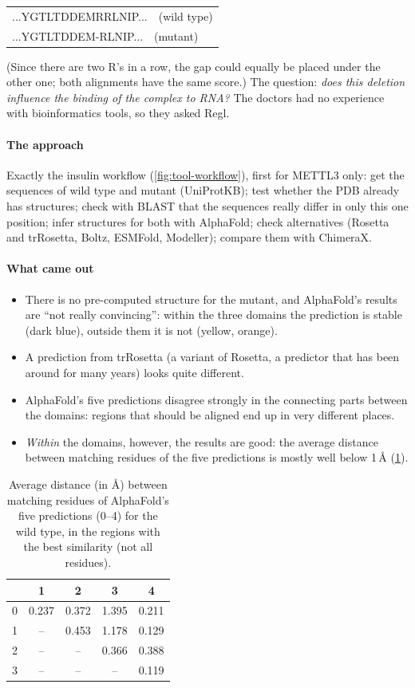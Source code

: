 \documentclass[11pt, oneside]{book}
\makeatletter
\newcommand{\alnblock}[1]{%
  \par\smallskip
  {\centering\ttfamily\small
   \begin{tabular}{@{}l@{}}#1\end{tabular}\par}%
  \smallskip}
\makeatother
\begin{document}
\alnblock{%
...YGTLTDDEMRRLNIP...~~(wild type)\\
...YGTLTDDEM-RLNIP...~~(mutant)}

(Since there are two R's in a row, the gap could equally be placed under the
other one; both alignments have the same score.) The question: \emph{does this
deletion influence the binding of the complex to RNA?} The doctors had no
experience with bioinformatics tools, so they asked Regl.

\paragraph{The approach}
Exactly the insulin workflow (\cref{fig:tool-workflow}), first for METTL3 only:
get the sequences of wild type and mutant (UniProtKB); test whether the PDB
already has structures; check with BLAST that the sequences really differ in
only this one position; infer structures for both with AlphaFold; check
alternatives (Rosetta and trRosetta, Boltz, ESMFold, Modeller); compare them
with ChimeraX.

\paragraph{What came out}
\begin{itemize}
  \item There is no pre-computed structure for the mutant, and AlphaFold's
    results are ``not really convincing'': within the three domains the
    prediction is stable (dark blue), outside them it is not (yellow, orange).
  \item A prediction from trRosetta (a variant of Rosetta, a predictor that has
    been around for many years) looks quite different.
  \item AlphaFold's five predictions disagree strongly in the connecting parts
    between the domains: regions that should be aligned end up in very
    different places.
  \item \emph{Within} the domains, however, the results are good: the average
    distance between matching residues of the five predictions is mostly well
    below 1\,\AA{} (\cref{tab:mettl3}).
\end{itemize}

\begin{table}[htbp]
\centering
\small
\begin{tabular}{@{}c|cccc@{}}
 & 1 & 2 & 3 & 4 \\
\midrule
0 & 0.237 & 0.372 & 1.395 & 0.211 \\
1 & --    & 0.453 & 1.178 & 0.129 \\
2 & --    & --    & 0.366 & 0.388 \\
3 & --    & --    & --    & 0.119 \\
\end{tabular}
\caption{Average distance (in \AA) between matching residues of AlphaFold's
five predictions (0--4) for the wild type, in the regions with the best
similarity (not all residues).}
\label{tab:mettl3}
\end{table}
\end{document}
